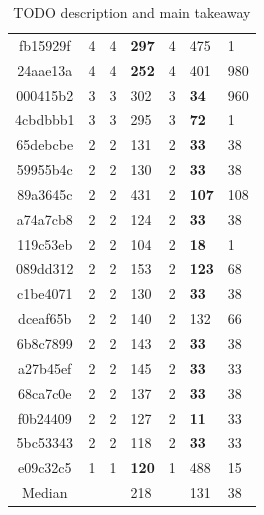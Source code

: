 \begin{table}
\begin{tabular}{c | r | r l | r l | t }
        
        fb15929f &                  4 &            4    &  \textbf{297} & 4 & 475 & 1 \\ 
        24aae13a &                  4 &         4       &  \textbf{252 } & 4 & 401 & 980\\ 
        000415b2 &                  3 &         3       &  302 & 3 & \textbf{34} & 960 \\
        
        4cbdbbb1 &                  3 &          3      &  295 & 3 & \textbf{72} & 1\\ 
        65debcbe &                  2 &          2      &  131  & 2 & \textbf{33} & 38 \\ 
        59955b4c &                  2 &          2      &  130  & 2 & \textbf{33} & 38 \\
        
        
        89a3645c &                  2 &           2     &  431 & 2 & \textbf{107} & 108\\
        a74a7cb8 &                  2 &           2     &  124 & 2 & \textbf{33} & 38 \\
        119c53eb &                  2 &           2     &  104 & 2 & \textbf{18} & 1 \\
        
        089dd312 &                  2 &           2     &  153 & 2 & \textbf{123} & 68\\
        c1be4071 &                  2 &           2     &  130 & 2 & \textbf{33} & 38\\
        dceaf65b &                  2 &           2     &  140 & 2 & 132 & 66\\
        
        6b8c7899 &                  2 &            2    &  143 & 2 & \textbf{33} & 38 \\
        a27b45ef &                  2 &         2       &  145 & 2 & \textbf{33} & 33\\
        68ca7c0e &                  2 &         2       &  137  & 2 & \textbf{33} & 38\\
        
        f0b24409 &                  2 &         2       &  127  & 2 & \textbf{11} & 33 \\
        5bc53343 &                  2 &         2       &  118  & 2 & \textbf{33} & 33 \\
        e09c32c5 &                  1 &         1       &  \textbf{120}  & 1 & 488 & 15 \\
        \hline\hline
        Median &                         &         &      218  &   & 131 & 38
    \end{tabular}
    \caption{TODO description and main takeaway}
    \label{offensive:results:fast}
\end{table}


